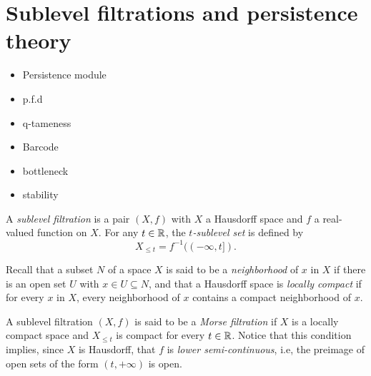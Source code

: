 
\section{Sublevel filtrations and persistence theory} \label{s:persistence}

\begin{itemize}
	\item Persistence module
	\item p.f.d
	\item q-tameness
	\item Barcode
	\item bottleneck
	\item stability
\end{itemize}

A \textit{sublevel filtration} is a pair $(X, f)$ with $X$ a Hausdorff space and $f$ a real-valued function on $X$.
For any $t \in \mathbb{R}$, the \textit{$t$-sublevel set} is defined by 
\begin{equation*}
X_{\leq t} = f^{-1}((-\infty, t]).
\end{equation*}

Recall that a subset $N$ of a space $X$ is said to be a \textit{neighborhood} of $x$ in $X$ if there is an open set $U$ with $x \in U \subseteq N$, and that a Hausdorff space is \textit{locally compact} if for every $x$ in $X$, every neighborhood of $x$ contains a compact neighborhood of $x$.

A sublevel filtration $(X, f)$ is said to be a \textit{Morse filtration} if $X$ is a locally compact space and $X_{\leq t}$ is compact for every $t \in \mathbb{R}$.
Notice that this condition implies, since $X$ is Hausdorff, that $f$ is \textit{lower semi-continuous}, i.e, the preimage of open sets of the form $(t, +\infty)$ is open.